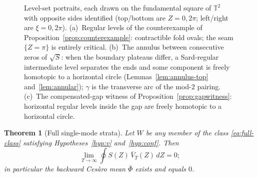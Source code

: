 \documentclass[11pt]{amsart}
\newtheorem{theorem}{Theorem}[section]
\theoremstyle{definition}
\theoremstyle{remark}
\newcommand{\T}{\mathbb{T}}
\newcommand{\Fbar}{\bar\Phi}
\begin{document}
\begin{figure}
\centering
{}
\caption{Level-set portraits, each drawn on the fundamental square of
$\T^2$ with opposite sides identified (top/bottom are $Z=0,2\pi$;
left/right are $\xi=0,2\pi$). (a)~Regular levels of the counterexample
of Proposition~\ref{prop:counterexample}: contractible fold ovals; the
seam $\{Z=\pi\}$ is entirely critical. (b)~The annulus between
consecutive zeros of $\sqrt S$: when the boundary plateaus differ, a
Sard-regular intermediate level separates the ends and some component is
freely homotopic to a horizontal circle
(Lemmas~\ref{lem:annulus-top} and~\ref{lem:annular}); $\gamma$ is the
transverse arc of the mod-$2$ pairing. (c)~The compensated-gap witness
of Proposition~\ref{prop:gapwitness}: horizontal regular levels inside
the gap are freely homotopic to a horizontal circle.}
\label{fig:portraits}
\end{figure}

\begin{theorem}[Full single-mode strata]\label{thm:full}
Let $W$ be any member of the class \eqref{eq:full-class} satisfying
Hypotheses~\ref{hyp:v} and~\ref{hyp:conf}. Then
\[
  \lim_{T\to\infty}\oint S(Z)\,\bar V_T(Z)\,dZ=0;
\]
in particular the backward Ces\`aro mean $\Fbar$ exists and equals $0$.
\end{theorem}
\end{document}
